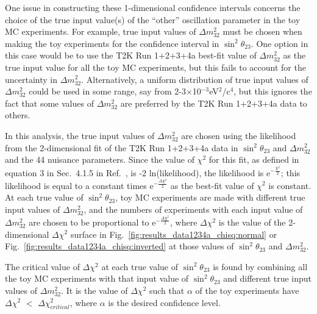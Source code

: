 One issue in constructing these 1-dimensional confidence intervals concerns the choice of the true input value(s) of the 
``other'' oscillation parameter in the toy MC experiments. For example, true input values of $\Delta m_{32}^{2}$ must be 
chosen when making the toy experiments for the confidence interval in $\sin^2 \theta_{23}$. One option in this case would 
be to use the T2K Run 1+2+3+4a best-fit value of $\Delta m_{32}^{2}$ as the true input value for all the toy MC experiments, 
but this fails to account for the uncertainty in $\Delta m_{32}^{2}$. Alternatively, a uniform distribution of true input 
values of $\Delta m_{32}^{2}$ could be used in some range, say from 2-3$\times$10$^{-3}$eV$^{2}$/c$^{4}$, but this ignores 
the fact that some values of $\Delta m_{32}^{2}$ are preferred by the T2K Run 1+2+3+4a data to others. 

In this analysis, the true input values of $\Delta m_{32}^{2}$ are chosen using the likelihood from the 2-dimensional fit of 
the T2K Run 1+2+3+4a data in $\sin^2 \theta_{23}$ and $\Delta m_{32}^{2}$ and the 44 nuisance parameters. Since the value of 
$\chi^{2}$ for this fit, as defined in equation 3 in Sec.\ 4.1.5 in Ref.\ \cite{OurRun123DisappAnalysis3Flavour}, is -2 ln(likelihood), 
the likelihood is e$^{-\frac{\chi^{2}}{2}}$; this likelihood is equal to a constant times e$^{-\frac{\Delta \chi^{2}}{2}}$ as the 
best-fit value of $\chi^{2}$ is constant. At each true value of $\sin^2 \theta_{23}$, toy MC experiments are made with different 
true input values of $\Delta m_{32}^{2}$, and the numbers of experiments with each input value of $\Delta m_{32}^{2}$ are 
chosen to be proportional to e$^{-\frac{\Delta \chi^{2}}{2}}$, where $\Delta \chi^{2}$ is the value of the 2-dimensional 
$\Delta \chi^{2}$ surface in Fig.\ \ref{fig:results_data1234a_chisq:normal} or Fig.\ \ref{fig:results_data1234a_chisq:inverted} 
at those values of $\sin^2 \theta_{23}$ and $\Delta m_{32}^{2}$. 

The critical value of $\Delta \chi^{2}$ at each true value of $\sin^2 \theta_{23}$ is found by combining all the toy MC 
experiments with that input value of $\sin^2 \theta_{23}$ and different true input values of $\Delta m_{32}^{2}$. It is the value 
of $\Delta \chi^{2}$ such that $\alpha$ of the toy experiments have $\Delta \chi^{2}$ $<$ $\Delta \chi^{2}_{critical}$, 
where $\alpha$ is the desired confidence level. 


